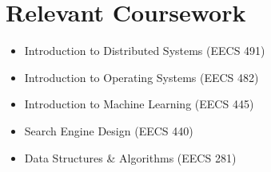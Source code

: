 \documentclass[letterpaper,11pt]{article}
\newcommand{\resumeItem}[1]{
  \item\small{
    {#1 \vspace{-2pt}}
  }
}
\newcommand{\resumeItemListStart}{\begin{itemize}}
\newcommand{\resumeItemListEnd}{\end{itemize}\vspace{-5pt}}
\begin{document}
%
\section{Relevant Coursework}
\resumeItemListStart{}
\resumeItem{Introduction to Distributed Systems (EECS 491)}
\resumeItem{Introduction to Operating Systems (EECS 482)}
\resumeItem{Introduction to Machine Learning (EECS 445)}
\resumeItem{Search Engine Design (EECS 440)}
\resumeItem{Data Structures \& Algorithms (EECS 281)}
\resumeItemListEnd{}


\end{document}
